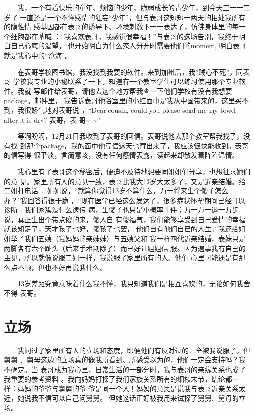 \documentclass[12pt]{book}
\begin{document}
　　我，一个有着快乐的童年、烦恼的少年、脆弱成长的青少年，到今天三十一二岁了
一直还是一个不懂感情的狂妄“少年”，但与表哥这短短一两天的相处我所有的隐性情
感基因都在表哥的诱导下、环境刺激下一一表达了，仿佛身体里的每一个细胞都在呐喊
：“我喜欢表哥，我感觉很幸福！”与表哥的这场告别，我终于明白自己心底的渴望，
也开始明白为什么恋人分开时需要他们的moment, 明白表哥就是我心中的“沧海”。

　　在表哥学校图书馆，我没找到我要的软件。来到加州后，我”贼心不死”，同表哥
学校我专业的小秘联系了一下，知道有一个教室学生可以练习使用那个专业软件。我就
写邮件给表哥，请他去这个地方帮我查一下他们学校有没有我想要package。邮件里，
我告诉表哥他浴室里的小红面巾是我从中国带来的，这里买不到，我很娇气地对表哥说
，“Dear cousin, could you please send me my towel after it is dry? 表哥，表
哥\textasciitilde{}~\textasciitilde{}”

　　等啊盼啊，12月21日我收到了表哥的回信。表哥说他去那个教室帮我找了，没有找
到那个package，我的面巾他写信这天也寄出来了，我应该很快能收到。表哥的信写得
很平淡，言简意垓，没有任何感情表露，读起来却散发着阵阵温情。

　　我心里有了表哥这个秘密后，便迫不及待地想要同姐姐们分享，也想征求她们的意
见。家里所有人的意见一致，表哥比我大13岁大太多了，又是近亲结婚。给二姐打电话
，姐姐说，“就算你觉得13岁不算什么，万一将来生个傻子怎么办？”我回答得很干脆
，“现在医学已经这么发达了，很多症状怀孕期间已经可以诊断；我们家簇没什么遗传
病，生傻子也只是小概率事件；万一万一退一万步说，真正生出个带点傻的来，傻人自
有傻福气，我们能够享受到自己爱情的幸福就该知足了，天才孩子也好，傻孩子也罢，
他们自有他们自已的人生。”我还给姐姐举了我们五姨（我妈妈的亲妹妹）与五姨父和
我一样四代近亲结婚，表妹只是两脚各有六个趾头（后来手术割除了）而已好让姐姐信
服。因为遇事我有自己的主见，所以就像说服二姐一样，我说服了家里所有的人。他们
心里可能还是有那么点不顺，但也不好再说我什么。

　　13岁差距究竟意味着什么我不懂，我只知道我们是相互喜欢的，无论如何我舍不得
表哥。
\section{立场　}
\label{sec-7-9}

　　我问过了家里所有人的立场和态度，即便他们有反对过的，全被我说服了。但舅舅
、舅母这边的立场真的像我所看到、所感受以为的，他们一定会支持吗？我不确定。当
表哥成为我心里、日常生活的一部分时，我与表哥的亲缘关系也成了我重要的参考资料
。我向妈妈打探了我们家族关系所有的细枝末节，结论都一样：妈妈的爷爷与舅舅的爷
爷是同一个人！妈妈的意思是说我与表哥近亲关系太近，她说我不信可以自己问舅舅。
但她这话正好被我用来试探了舅舅、舅母的立场。
\end{document}
